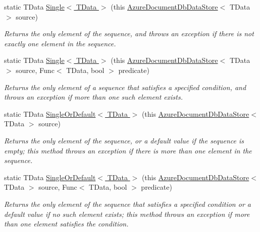 \begin{DoxyCompactItemize}
\item 
static T\+Data \hyperlink{classSystem_1_1Linq_1_1AzureDocumentDbDataStoreExtensions_a0db5f545a8b606324451bfec69db7862}{Single$<$ T\+Data $>$} (this \hyperlink{classCqrs_1_1Azure_1_1DocumentDb_1_1DataStores_1_1AzureDocumentDbDataStore}{Azure\+Document\+Db\+Data\+Store}$<$ T\+Data $>$ source)
\begin{DoxyCompactList}\small\item\em Returns the only element of the sequence, and throws an exception if there is not exactly one element in the sequence. \end{DoxyCompactList}\item 
static T\+Data \hyperlink{classSystem_1_1Linq_1_1AzureDocumentDbDataStoreExtensions_a88615fafe8c7bb0f9a0804eb4e4f0472}{Single$<$ T\+Data $>$} (this \hyperlink{classCqrs_1_1Azure_1_1DocumentDb_1_1DataStores_1_1AzureDocumentDbDataStore}{Azure\+Document\+Db\+Data\+Store}$<$ T\+Data $>$ source, Func$<$ T\+Data, bool $>$ predicate)
\begin{DoxyCompactList}\small\item\em Returns the only element of a sequence that satisfies a specified condition, and throws an exception if more than one such element exists. \end{DoxyCompactList}\item 
static T\+Data \hyperlink{classSystem_1_1Linq_1_1AzureDocumentDbDataStoreExtensions_ab0724b844d77e86bee14ce246161b6be}{Single\+Or\+Default$<$ T\+Data $>$} (this \hyperlink{classCqrs_1_1Azure_1_1DocumentDb_1_1DataStores_1_1AzureDocumentDbDataStore}{Azure\+Document\+Db\+Data\+Store}$<$ T\+Data $>$ source)
\begin{DoxyCompactList}\small\item\em Returns the only element of the sequence, or a default value if the sequence is empty; this method throws an exception if there is more than one element in the sequence. \end{DoxyCompactList}\item 
static T\+Data \hyperlink{classSystem_1_1Linq_1_1AzureDocumentDbDataStoreExtensions_a37c11caa4a5e82f4761bf3b910ee0f15}{Single\+Or\+Default$<$ T\+Data $>$} (this \hyperlink{classCqrs_1_1Azure_1_1DocumentDb_1_1DataStores_1_1AzureDocumentDbDataStore}{Azure\+Document\+Db\+Data\+Store}$<$ T\+Data $>$ source, Func$<$ T\+Data, bool $>$ predicate)
\begin{DoxyCompactList}\small\item\em Returns the only element of the sequence that satisfies a specified condition or a default value if no such element exists; this method throws an exception if more than one element satisfies the condition. \end{DoxyCompactList}\item 

\end{DoxyCompactItemize}

